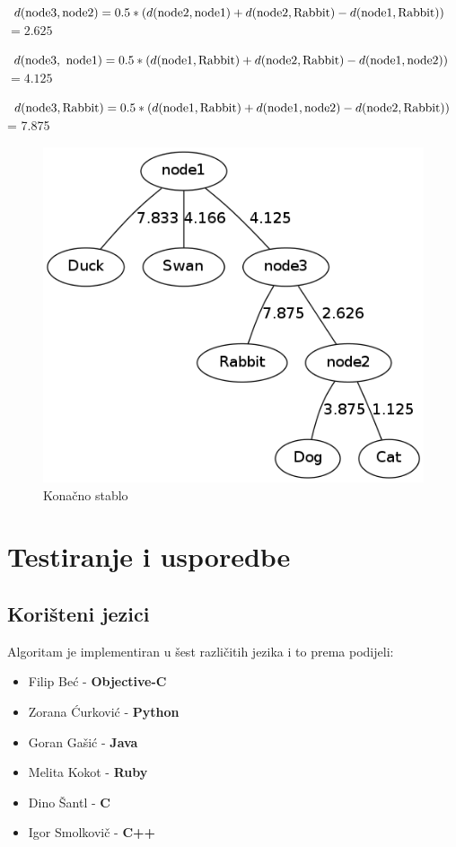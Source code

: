 \documentclass[times, utf8, seminar, numeric]{fer}
\begin{document}
\indent $d(\textup{node3}, \textup{node2}) = 0.5 * (d(\textup{node2}, \textup{node1}) + d(\textup{node2}, \textup{Rabbit}) - d(\textup{node1}, \textup{Rabbit})) $ \newline
\indent $= 2.625$ \newline

\indent $d(\textup{node3},\textup{ node1}) = 0.5 * (d(\textup{node1}, \textup{Rabbit}) + d(\textup{node2}, \textup{Rabbit}) - d(\textup{node1}, \textup{node2})) $ \newline
\indent $=4.125 $ \newline

\indent $d(\textup{node3},\textup{Rabbit}) = 0.5 * (d(\textup{node1}, \textup{Rabbit}) + d(\textup{node1}, \textup{node2}) - d(\textup{node2}, \textup{Rabbit})) $ \newline
\indent = 7.875 \newline


\begin{figure}[htb]
\centering
\includegraphics[scale=0.6]{./img/zadnji.png}
\caption{Konačno stablo}
\end{figure}

\chapter{Testiranje i usporedbe}
\section{Korišteni jezici}
Algoritam je implementiran u šest različitih jezika i to prema podijeli:
\begin{itemize}
	\item Filip Beć - \textbf{Objective-C}
	\item Zorana Ćurković - \textbf{Python}
	\item Goran Gašić - \textbf{Java}
	\item Melita Kokot - \textbf{Ruby}
	\item Dino Šantl - \textbf{C}
	\item Igor Smolkovič - \textbf{C++}
\end{itemize}
\end{document}
